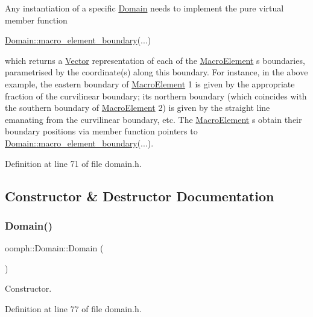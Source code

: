  Any instantiation of a specific \hyperlink{classoomph_1_1Domain}{Domain} needs to implement the pure virtual member function 
\begin{DoxyCode}
\hyperlink{classoomph_1_1Domain_a95f3e00d28ea37e6c4d3027bfac91096}{Domain::macro\_element\_boundary}(...) 
\end{DoxyCode}
 which returns a \hyperlink{classoomph_1_1Vector}{Vector} representation of each of the \hyperlink{classoomph_1_1MacroElement}{Macro\+Element} s\textquotesingle{} boundaries, parametrised by the coordinate(s) along this boundary. For instance, in the above example, the eastern boundary of \hyperlink{classoomph_1_1MacroElement}{Macro\+Element} 1 is given by the appropriate fraction of the curvilinear boundary; its northern boundary (which coincides with the southern boundary of \hyperlink{classoomph_1_1MacroElement}{Macro\+Element} 2) is given by the straight line emanating from the curvilinear boundary, etc. The \hyperlink{classoomph_1_1MacroElement}{Macro\+Element} s obtain their boundary positions via member function pointers to {\ttfamily \hyperlink{classoomph_1_1Domain_a95f3e00d28ea37e6c4d3027bfac91096}{Domain\+::macro\+\_\+element\+\_\+boundary}}(...). 

Definition at line 71 of file domain.\+h.



\subsection{Constructor \& Destructor Documentation}
\mbox{\label{classoomph_1_1Domain_a091982333107142c3ac71a02fbdb6ac8}} 
\subsubsection{\texorpdfstring{Domain()}{Domain()}\hspace{0.1cm}{\footnotesize\ttfamily [1/2]}}
{\footnotesize\ttfamily oomph\+::\+Domain\+::\+Domain (\begin{DoxyParamCaption}{ }\end{DoxyParamCaption})\hspace{0.3cm}{\ttfamily [inline]}}



Constructor. 



Definition at line 77 of file domain.\+h.




